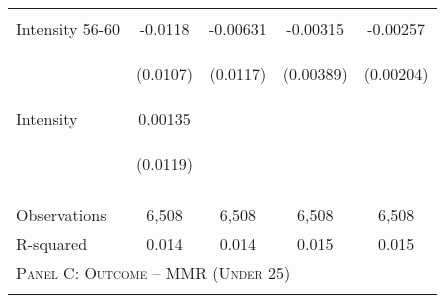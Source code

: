 \begin{subtables}
\begin{table}[htpb!]
\begin{center}
\begin{tabular}{p{5cm}cccc}
\begin{footnotesize}\end{footnotesize}&\begin{footnotesize}\end{footnotesize}&\begin{footnotesize}\end{footnotesize}&\begin{footnotesize}\end{footnotesize}\\ 
Intensity 56-60&-0.0118&-0.00631&-0.00315&-0.00257\\ 
&\begin{footnotesize}(0.0107)\end{footnotesize}&\begin{footnotesize}(0.0117)\end{footnotesize}&\begin{footnotesize}(0.00389)\end{footnotesize}&\begin{footnotesize}(0.00204)\end{footnotesize}\\ 
Intensity      &0.00135&&&\\ 
&\begin{footnotesize}(0.0119)\end{footnotesize}&&\\ 
\begin{footnotesize}\end{footnotesize}&\begin{footnotesize}\end{footnotesize}&\begin{footnotesize}\end{footnotesize}&\begin{footnotesize}\end{footnotesize}\\ 
Observations&6,508&6,508&6,508&6,508\\ 
R-squared&0.014&0.014&0.015&0.015\\ \midrule 
\multicolumn{5}{l}{\textsc{Panel C: Outcome -- MMR (Under 25)}}\\ 
\begin{footnotesize}\end{footnotesize}&\begin{footnotesize}\end{footnotesize}&\begin{footnotesize}\end{footnotesize}&\begin{footnotesize}\end{footnotesize}\\ 

\end{tabular}
\end{center}
\end{table}
\end{subtables}
